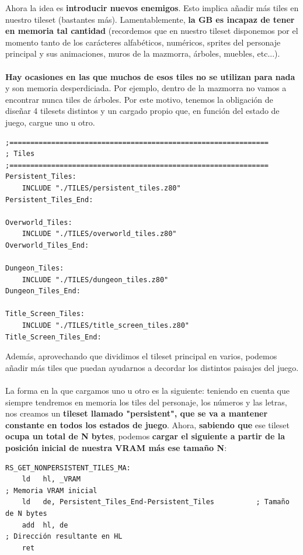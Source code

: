 Ahora la idea es \textbf{introducir nuevos enemigos}. Esto implica añadir más tiles en nuestro tileset (bastantes más). Lamentablemente, \textbf{la GB es incapaz de tener en memoria tal cantidad} (recordemos que en nuestro tileset disponemos por el momento tanto de los carácteres alfabéticos, numéricos, sprites del personaje principal y sus animaciones, muros de la mazmorra, árboles, muebles, etc...). 
\\ \\
\textbf{Hay ocasiones en las que muchos de esos tiles no se utilizan para nada} y son memoria desperdiciada. Por ejemplo, dentro de la mazmorra no vamos a encontrar nunca tiles de árboles. Por este motivo, tenemos la obligación de diseñar 4 tilesets distintos y un cargado propio que, en función del estado de juego, cargue uno u otro.

\begin{lstlisting}[caption={Múltiples Tilesets}, label={code:multilesets}]
;==============================================================
; Tiles
;==============================================================
Persistent_Tiles:
	INCLUDE "./TILES/persistent_tiles.z80"
Persistent_Tiles_End:

Overworld_Tiles:
	INCLUDE "./TILES/overworld_tiles.z80"
Overworld_Tiles_End:

Dungeon_Tiles:
	INCLUDE "./TILES/dungeon_tiles.z80"
Dungeon_Tiles_End:

Title_Screen_Tiles:
	INCLUDE "./TILES/title_screen_tiles.z80"
Title_Screen_Tiles_End:
\end{lstlisting}

Además, aprovechando que dividimos el tileset principal en varios, podemos añadir más tiles que puedan ayudarnos a decordar los distintos paisajes del juego.
\\ \\
La forma en la que cargamos uno u otro es la siguiente: teniendo en cuenta que siempre tendremos en memoria los tiles del personaje, los números y las letras, nos creamos un \textbf{tileset llamado "persistent", que se va a mantener constante en todos los estados de juego}. Ahora, \textbf{sabiendo que} ese tileset \textbf{ocupa un total de N bytes}, podemos \textbf{cargar el siguiente a partir de la posición inicial de nuestra VRAM más ese tamaño N}:

\begin{lstlisting}[caption={Múltiples Tilesets}, label={code:multilesets}]
RS_GET_NONPERSISTENT_TILES_MA:
	ld	 hl, _VRAM 															; Memoria VRAM inicial
	ld	 de, Persistent_Tiles_End-Persistent_Tiles 			; Tamaño de N bytes
	add  hl, de 																; Dirección resultante en HL
	ret
\end{lstlisting}

